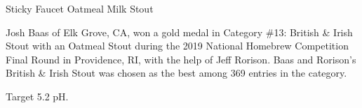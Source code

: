 \stylesection{\styleoatmealstout}

\begin{recipie}{Sticky Faucet Oatmeal Milk Stout}

\begin{aboutblock}
Josh Baas of Elk Grove, CA, won a gold medal in Category \#13: British \& Irish
Stout with an Oatmeal Stout during the 2019 National Homebrew Competition
Final Round in Providence, RI, with the help of Jeff Rorison. Baas and Rorison's
British \& Irish Stout was chosen as the best among 369 entries in the category.
\sourceaha
\end{aboutblock}


\begin{methodandtiming}
 
\begin{mashsteps}
\end{mashsteps}

\begin{fermentationsteps}
\end{fermentationsteps}

\begin{directions}
Target 5.2 pH.
\end{directions}

\end{methodandtiming}

\pagebreak

\begin{ingredientsblock}

\begin{malts}
\end{malts}

\begin{hops}
\end{hops}


\end{ingredientsblock}

\end{recipie}
